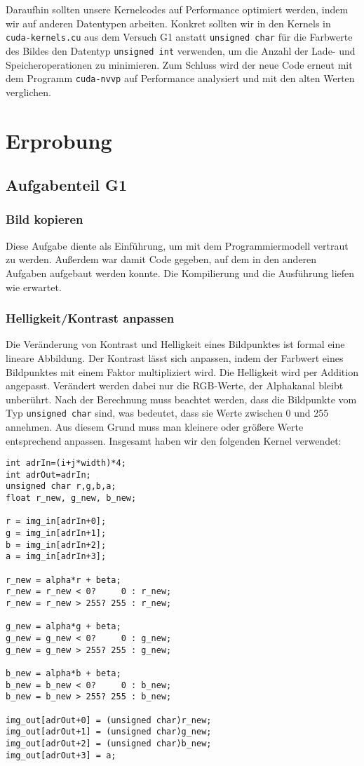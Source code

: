 \documentclass[12pt,a4paper]{scrartcl}
\begin{document}
Daraufhin sollten unsere Kernelcodes auf Performance optimiert werden, indem wir auf anderen Datentypen arbeiten.
Konkret sollten wir in den Kernels in \texttt{cuda-kernels.cu} aus dem Versuch G1 anstatt \texttt{unsigned char} f\"ur die Farbwerte des Bildes den Datentyp \texttt{unsigned int} verwenden, um die Anzahl der Lade- und Speicheroperationen zu minimieren.
Zum Schluss wird der neue Code erneut mit dem Programm \texttt{cuda-nvvp} auf Performance analysiert und mit den alten Werten verglichen.
\section{Erprobung}

\subsection{Aufgabenteil G1}

\subsubsection{Bild kopieren}
Diese Aufgabe diente als Einf\"uhrung, um mit dem Programmiermodell vertraut zu werden.
Au\ss erdem war damit Code gegeben, auf dem in den anderen Aufgaben aufgebaut werden konnte.
Die Kompilierung und die Ausf\"uhrung liefen wie erwartet.

\subsubsection{Helligkeit/Kontrast anpassen}
Die Ver\"anderung von Kontrast und Helligkeit eines Bildpunktes ist formal eine lineare Abbildung.
Der Kontrast l\"asst sich anpassen, indem der Farbwert eines Bildpunktes mit einem Faktor multipliziert wird.
Die Helligkeit wird per Addition angepasst.
Ver\"andert werden dabei nur die RGB-Werte, der Alphakanal bleibt unber\"uhrt.
Nach der Berechnung muss beachtet werden, dass die Bildpunkte vom Typ \texttt{unsigned char} sind, was bedeutet, dass sie Werte zwischen 0 und 255 annehmen.
Aus diesem Grund muss man kleinere oder gr\"o\ss ere Werte entsprechend anpassen.
Insgesamt haben wir den folgenden Kernel verwendet:

\begin{lstlisting}[caption=linearTransformKernel,label=a2.2]
int adrIn=(i+j*width)*4;
int adrOut=adrIn;
unsigned char r,g,b,a;
float r_new, g_new, b_new;
        
r = img_in[adrIn+0];
g = img_in[adrIn+1];
b = img_in[adrIn+2];
a = img_in[adrIn+3];
        
r_new = alpha*r + beta;
r_new = r_new < 0?     0 : r_new;
r_new = r_new > 255? 255 : r_new;
        
g_new = alpha*g + beta;
g_new = g_new < 0?     0 : g_new;
g_new = g_new > 255? 255 : g_new;
        
b_new = alpha*b + beta;
b_new = b_new < 0?     0 : b_new;
b_new = b_new > 255? 255 : b_new;
        
img_out[adrOut+0] = (unsigned char)r_new;
img_out[adrOut+1] = (unsigned char)g_new;
img_out[adrOut+2] = (unsigned char)b_new;
img_out[adrOut+3] = a;

\end{lstlisting}
\end{document}
